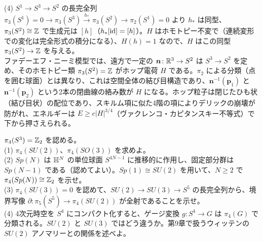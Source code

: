 \begin{solution}
(4) $S^1\to S^3\to S^2$ の長完全列 $\pi_3(S^1)=0\to\pi_3(S^3)\xrightarrow{h_*}\pi_3(S^2)\to\pi_2(S^1)=0$ より $h_*$ は同型、$\pi_3(S^2)\cong\mathbb{Z}$ で生成元は $[h]$（$h_*[\mathrm{id}]=[h]$）。$H$ はホモトピー不変で（連続変形での変化は完全形式の積分になる）、$H(h)=1$ なので、$H$ はこの同型 $\pi_3(S^2)\to\mathbb{Z}$ を与える。\\
ファデーエフ・ニーミ模型では、遠方で一定の $\bm n\colon\mathbb{R}^3\to S^2$ は $S^3\to S^2$ を定め、そのホモトピー類 $\pi_3(S^2)=\mathbb{Z}$ がホップ電荷 $H$ である。$\pi_2$ による分類（点を囲む球面）とは異なり、これは空間全体の結び目構造であり、$\bm n^{-1}(\bm p_1)$ と $\bm n^{-1}(\bm p_2)$ という2本の閉曲線の絡み数が $H$ になる。ホップ粒子は閉じたひも状（結び目状）の配位であり、スキルム項に似た4階の項によりデリックの崩壊が防がれ、エネルギーは $E\ge c\lvert H\rvert^{3/4}$（ヴァクレンコ・カピタンスキー不等式）で下から押さえられる。
\end{solution}

\begin{problem}[難易度 C]\label{ch03-prob-pi4}
$\pi_4(S^3)=\mathbb{Z}_2$ を認める。\\
(1) $\pi_4(SU(2))$、$\pi_4(SO(3))$ を求めよ。\\
(2) $Sp(N)$ は $\mathbb{H}^N$ の単位球面 $S^{4N-1}$ に推移的に作用し、固定部分群は $Sp(N-1)$ である（認めてよい）。$Sp(1)\cong SU(2)$ を用いて、$N\ge2$ で $\pi_4(Sp(N))\cong\mathbb{Z}_2$ を示せ。\\
(3) $\pi_4(SU(3))=0$ を認めて、$SU(2)\to SU(3)\to S^5$ の長完全列から、境界写像 $\partial\colon\pi_5(S^5)\to\pi_4(SU(2))$ が全射であることを示せ。\\
(4) 4次元時空を $S^4$ にコンパクト化すると、ゲージ変換 $g\colon S^4\to G$ は $\pi_4(G)$ で分類される。$SU(2)$ と $SU(3)$ ではどう違うか。第9章で扱うウィッテンの $SU(2)$ アノマリーとの関係を述べよ。
\end{problem}

